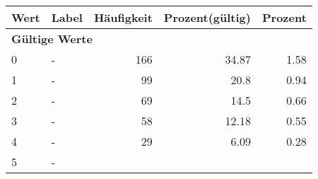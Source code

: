      \begin{longtable}{lXrrr}
     \toprule
     \textbf{Wert} & \textbf{Label} & \textbf{Häufigkeit} & \textbf{Prozent(gültig)} & \textbf{Prozent} \\
     \endhead
     \midrule
     \multicolumn{5}{l}{\textbf{Gültige Werte}}\\

     0 &
     \multicolumn{1}{X}{ -  } &


       \num{166} &
       \num[round-mode=places,round-precision=2]{34,87} &
         \num[round-mode=places,round-precision=2]{1,58} \\

     1 &
     \multicolumn{1}{X}{ -  } &


       \num{99} &
       \num[round-mode=places,round-precision=2]{20,8} &
         \num[round-mode=places,round-precision=2]{0,94} \\

     2 &
     \multicolumn{1}{X}{ -  } &


       \num{69} &
       \num[round-mode=places,round-precision=2]{14,5} &
         \num[round-mode=places,round-precision=2]{0,66} \\

     3 &
     \multicolumn{1}{X}{ -  } &


       \num{58} &
       \num[round-mode=places,round-precision=2]{12,18} &
         \num[round-mode=places,round-precision=2]{0,55} \\

     4 &
     \multicolumn{1}{X}{ -  } &


       \num{29} &
       \num[round-mode=places,round-precision=2]{6,09} &
         \num[round-mode=places,round-precision=2]{0,28} \\

     5 &
     \multicolumn{1}{X}{ -  } &



\end{longtable}
